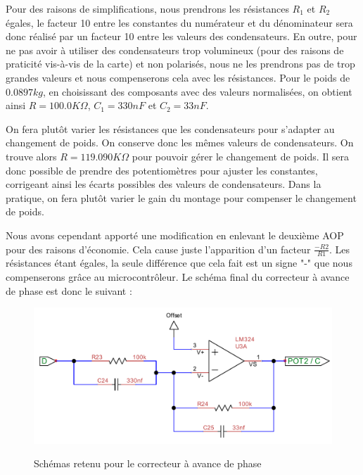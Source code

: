 \documentclass[11pt, french]{article} %
\begin{document}
\vspace{0.5cm}

Pour des raisons de simplifications, nous prendrons les résistances $R_1$ et $R_2$ égales, le facteur 10 entre les constantes du numérateur et du dénominateur sera donc réalisé par un facteur 10 entre les valeurs des condensateurs. En outre, pour ne pas avoir à utiliser des condensateurs trop volumineux (pour des raisons de praticité vis-à-vis de la carte) et non polarisés, nous ne les prendrons pas de trop grandes valeurs et nous compenserons cela avec les résistances. Pour le poids de $0.0897 kg$, en choisissant des composants avec des valeurs normalisées, on obtient ainsi $R=100.0 K\Omega$, $C_1=330 nF$ et $C_2=33 nF$.

\vspace{0.5cm}
On fera plutôt varier les résistances que les condensateurs pour s'adapter au changement de poids. On conserve donc les mêmes valeurs de condensateurs. On trouve alors $R=119.090 K\Omega$ pour pouvoir gérer le changement de poids. Il sera donc possible de prendre des potentiomètres pour ajuster les constantes, corrigeant ainsi les écarts possibles des valeurs de condensateurs. Dans la pratique, on fera plutôt varier le gain du montage pour compenser le changement de poids. 

\vspace{0.5cm}

Nous avons cependant apporté une modification en enlevant le deuxième AOP pour des raisons d'économie. Cela cause juste l'apparition d'un facteur $\frac{-R2}{R1}$. Les résistances étant égales, la seule différence que cela fait est un signe "-" que nous compenserons grâce au microcontrôleur. Le schéma final du correcteur à avance de phase est donc le suivant :

\begin{figure}[!h]
    \centering
	\includegraphics[scale = 0.8]{SolutionAnalogique/AvPhase.pdf}
	\label{avph_schm}
	\caption{Schémas retenu pour le correcteur à avance de phase}
\end{figure}
\end{document}
